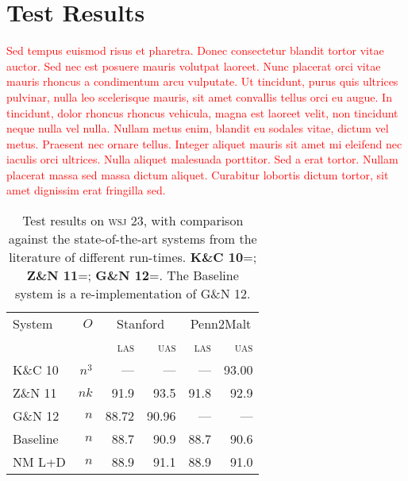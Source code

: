 \documentclass[11pt,letterpaper]{article}
\newcommand{\las}{\textsc{las}\xspace}
\newcommand{\uas}{\textsc{uas}\xspace}
\newcommand{\wsj}{\textsc{wsj}\xspace}
\newcommand{\note}[1]{\textcolor{red}{#1}}
\begin{document}



\section{Test Results}

\note{Sed tempus euismod risus et pharetra. Donec consectetur blandit tortor vitae auctor. Sed nec est posuere mauris volutpat laoreet. Nunc placerat orci vitae mauris rhoncus a condimentum arcu vulputate. Ut tincidunt, purus quis ultrices pulvinar, nulla leo scelerisque mauris, sit amet convallis tellus orci eu augue. In tincidunt, dolor rhoncus rhoncus vehicula, magna est laoreet velit, non tincidunt neque nulla vel nulla. Nullam metus enim, blandit eu sodales vitae, dictum vel metus. Praesent nec ornare tellus. Integer aliquet mauris sit amet mi eleifend nec iaculis orci ultrices. Nulla aliquet malesuada porttitor. Sed a erat tortor. Nullam placerat massa sed massa dictum aliquet. Curabitur lobortis dictum tortor, sit amet dignissim erat fringilla sed.}


\begin{table}
    \centering
    \small
    \begin{tabular}{l|r|rr|rr}
        \hline 
System  &   $O$ &  \multicolumn{2}{c}{Stanford} & \multicolumn{2}{|c}{Penn2Malt} \\
        &       &  \las  & \uas  & \las & \uas \\
        \hline \hline
K\&C 10  & $n^3$ & ---   & ---   & ---  & 93.00 \\
Z\&N 11  & $nk$  & 91.9  & 93.5  & 91.8 & 92.9 \\
G\&N 12  & $n$   & 88.72 & 90.96 & ---  & --- \\
        \hline
Baseline    & $n$ & 88.7 & 90.9 & 88.7  & 90.6 \\
NM L+D      & $n$ & 88.9 & 91.1 & 88.9  & 91.0 \\
\hline
    \end{tabular}
    \caption{\small Test results on \wsj 23, with comparison against the
        state-of-the-art systems from the literature of different run-times.
        \textbf{K\&C 10}=\citet{koo:10}; \textbf{Z\&N 11}=\citet{zhang:11};
        \textbf{G\&N 12}=\citet{goldberg:12}. The Baseline system is a re-implementation
             of G\&N 12.\label{tab:eval}}
\end{table}
\end{document}
